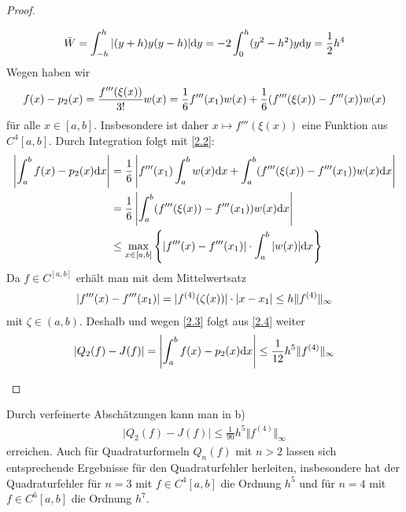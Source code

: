 \begin{proof}
\begin{enumerate}[label=(\alph*)]
\begin{align}
		\label{2.3}
			\overline{W}=\int_{-h}^{h}\vert (y+h)y(y-h)\vert\diff y=-2\int_{0}^{h} (y^2-h^2)y\diff y=\frac{1}{2}h^4
		\end{align}
		Wegen  haben wir
		\begin{align}
			f(x)-p_2(x)=\frac{f'''(\xi(x))}{3!}w(x)=\frac{1}{6}f'''(x_1)w(x)+\frac{1}{6}(f'''(\xi(x))-f'''(x))w(x)\notag
		\end{align}
		für alle $x\in[a,b]$. Insbesondere ist daher $x\mapsto f'''(\xi(x))$ eine Funktion aus $C^4[a,b]$. Durch Integration folgt mit \cref{2.2}:
		\begin{align}
			\label{2.4}
			\begin{split}
				\left|\int_a^b f(x)-p_2(x)\mathrm{d} x\right| &= \frac{1}{6}\left|f'''(x_1)\int_a^b w(x)\mathrm{d} x+\int_a^b (f'''(\xi(x))-f'''(x_1))w(x)\mathrm{d} x\right| \\
				&= \frac{1}{6}\left|\int_a^b (f'''(\xi(x))-f'''(x_1))w(x)\mathrm{d} x\right| \\
				&\le \max_{x\in [a,b]}\left\lbrace\left|f'''(x)-f'''(x_1)\right|\cdot\int_a^b\vert w(x)\vert\mathrm{d} x\right\rbrace
			\end{split}
		\end{align}
		Da $f\in C^[a,b]$ erhält man mit dem Mittelwertsatz
		\begin{align}
			\vert f'''(x)-f'''(x_1)\vert = \vert f^{(4)}(\zeta(x))\vert\cdot\vert x-x_1\vert\le h\Vert f^{(4)}\Vert_\infty\notag
		\end{align}
		mit $\zeta\in (a,b)$. Deshalb und wegen \cref{2.3} folgt aus \cref{2.4} weiter
		\begin{align}
			\vert Q_2(f)-J(f)\vert =\left|\int_a^b f(x)-p_2(x)\mathrm{d} x\right|\le\frac{1}{12}h^5\Vert f^{(4)}\Vert_\infty\notag
		\end{align}
	\end{enumerate}
\end{proof}

\begin{remark}
	Durch verfeinerte Abschätzungen kann man in  b) 
	\begin{align}
		\label{2.5}
		\vert Q_2(f)-J(f)\vert\le \frac{1}{90}h^5\Vert f^{(4)}\Vert_\infty
	\end{align}
	erreichen. Auch für Quadraturformeln $Q_n(f)$ mit $n>2$ lassen sich entsprechende Ergebnisse für den Quadraturfehler herleiten, insbesondere hat der Quadraturfehler für $n=3$ mit $f\in C^4[a,b]$ die Ordnung $h^5$ und für $n=4$ mit $f\in C^6[a,b]$ die Ordnung $h^7$.
\end{remark}